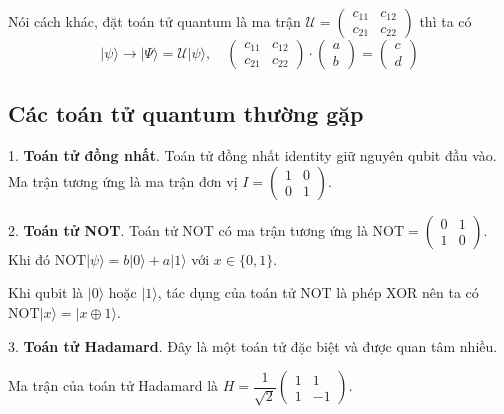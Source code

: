 Nói cách khác, đặt toán tử quantum là ma trận $\mathcal{U} = \begin{pmatrix} c_{11} & c_{12} \\ c_{21} & c_{22} \end{pmatrix}$ thì ta có
\begin{equation*}
    \lvert \psi \rangle \to \lvert \Psi \rangle = \mathcal{U} \lvert \psi \rangle, \quad \begin{pmatrix} c_{11} & c_{12} \\ c_{21} & c_{22} \end{pmatrix} \cdot \begin{pmatrix} a \\ b \end{pmatrix} = \begin{pmatrix} c \\ d \end{pmatrix}
\end{equation*}

\subsection*{Các toán tử quantum thường gặp}

1. \textbf{Toán tử đồng nhất}. Toán tử đồng nhất identity giữ nguyên qubit đầu vào. Ma trận tương ứng là ma trận đơn vị $I = \begin{pmatrix} 1 & 0 \\ 0 & 1 \end{pmatrix}$.

2. \textbf{Toán tử NOT}. Toán tử NOT có ma trận tương ứng là $\text{NOT} = \begin{pmatrix} 0 & 1 \\ 1 & 0 \end{pmatrix}$. Khi đó $\text{NOT} \lvert \psi \rangle = b \lvert 0 \rangle + a \lvert 1 \rangle$ với $x \in \{ 0, 1 \}$.

Khi qubit là $\lvert 0 \rangle$ hoặc $\lvert 1 \rangle$, tác dụng của toán tử NOT là phép XOR nên ta có $\text{NOT} \lvert x \rangle = \lvert x \oplus 1 \rangle$.

3. \textbf{Toán tử Hadamard}. Đây là một toán tử đặc biệt và được quan tâm nhiều.

Ma trận của toán tử Hadamard là $H = \dfrac{1}{\sqrt{2}} \begin{pmatrix} 1 & 1 \\ 1 & - 1 \end{pmatrix}$. 

